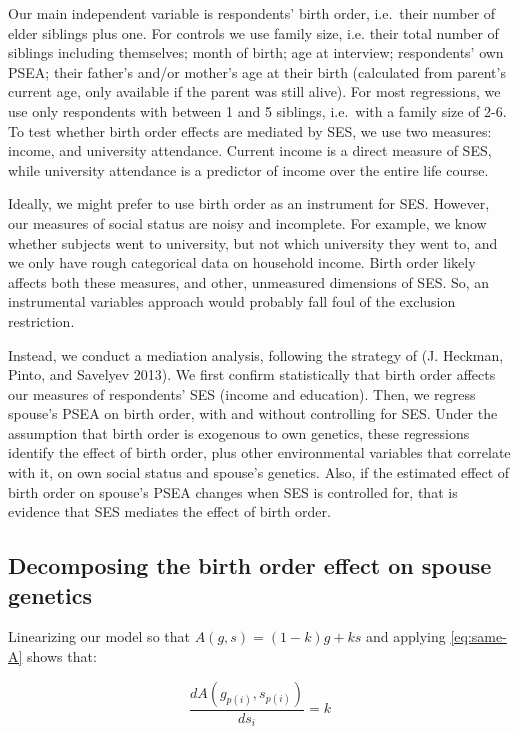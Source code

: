 \documentclass[
]{article}
\begin{document}
Our main independent variable is respondents' birth order, i.e.~their
number of elder siblings plus one. For controls we use family size, i.e.
their total number of siblings including themselves; month of birth; age
at interview; respondents' own PSEA; their father's and/or mother's age
at their birth (calculated from parent's current age, only available if
the parent was still alive). For most regressions, we use only
respondents with between 1 and 5 siblings, i.e.~with a family size of
2-6. To test whether birth order effects are mediated by SES, we use two
measures: income, and university attendance. Current income is a direct
measure of SES, while university attendance is a predictor of income
over the entire life course.

Ideally, we might prefer to use birth order as an instrument for SES.
However, our measures of social status are noisy and incomplete. For
example, we know whether subjects went to university, but not which
university they went to, and we only have rough categorical data on
household income. Birth order likely affects both these measures, and
other, unmeasured dimensions of SES. So, an instrumental variables
approach would probably fall foul of the exclusion restriction.

Instead, we conduct a mediation analysis, following the strategy of
(J. Heckman, Pinto, and Savelyev 2013). We first confirm statistically that birth
order affects our measures of respondents' SES (income and education).
Then, we regress spouse's PSEA on birth order, with and without
controlling for SES. Under the assumption that birth order is exogenous
to own genetics, these regressions identify the effect of birth order,
plus other environmental variables that correlate with it, on own social
status and spouse's genetics. Also, if the estimated effect of birth
order on spouse's PSEA changes when SES is controlled for, that is
evidence that SES mediates the effect of birth order.

\hypertarget{decomposing-the-birth-order-effect-on-spouse-genetics}{%
\subsection{Decomposing the birth order effect on spouse genetics}\label{decomposing-the-birth-order-effect-on-spouse-genetics}}

Linearizing our model so that \(A(g, s) = (1-k)g + ks\) and applying
\eqref{eq:same-A} shows that:

\[
\frac{d A(g_{p(i)}, s_{p(i)})}{d s_i} = k
\]
\end{document}
